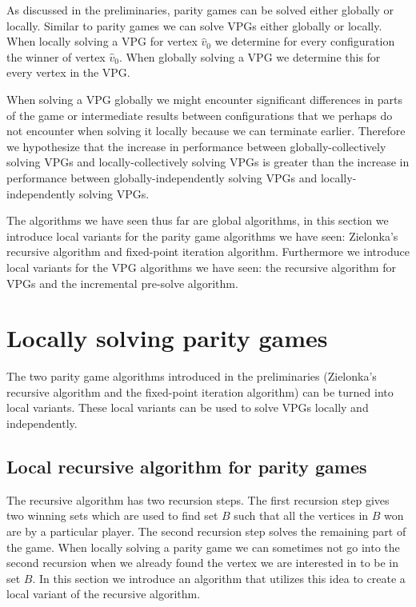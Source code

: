 As discussed in the preliminaries, parity games can be solved either globally or locally. Similar to parity games we can solve VPGs either globally or locally. When locally solving a VPG for vertex $\hat{v}_0$ we determine for every configuration the winner of vertex $\hat{v}_0$. When globally solving a VPG we determine this for every vertex in the VPG.

When solving a VPG globally we might encounter significant differences in parts of the game or intermediate results between configurations that we perhaps do not encounter when solving it locally because we can terminate earlier. Therefore we hypothesize that the increase in performance between globally-collectively solving VPGs and locally-collectively solving VPGs is greater than the increase in performance between globally-independently solving VPGs and locally-independently solving VPGs.

The algorithms we have seen thus far are global algorithms, in this section we introduce local variants for the parity game algorithms we have seen: Zielonka's recursive algorithm and fixed-point iteration algorithm. Furthermore we introduce local variants for the VPG algorithms we have seen: the recursive algorithm for VPGs and the incremental pre-solve algorithm.

\section{Locally solving parity games}
The two parity game algorithms introduced in the preliminaries (Zielonka's recursive algorithm and the fixed-point iteration algorithm) can be turned into local variants. These local variants can be used to solve VPGs locally and independently.

\subsection{Local recursive algorithm for parity games}
\label{sec:zlnk_org_local}
The recursive algorithm has two recursion steps. The first recursion step gives two winning sets which are used to find set $B$ such that all the vertices in $B$ won are by a particular player. The second recursion step solves the remaining part of the game. When locally solving a parity game we can sometimes not go into the second recursion when we already found the vertex we are interested in to be in set $B$. In this section we introduce an algorithm that utilizes this idea to create a local variant of the recursive algorithm.

